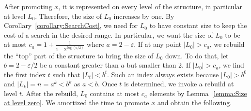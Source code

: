 \documentclass[11pt]{article}       %
\begin{document}
After promoting $x$, it is represented on every level of the structure, in particular at level $L_0$. 
Therefore, the size of $L_0$ increases by one. 
By Corollary~\ref{corollary:SearchCost}, we need for $L_0$ to have constant size to keep the cost of a search in the desired range.
In particular, we want the size of $L_0$ to be at most $c_a = 1+\frac{1}{1-2^{\log (a/2)}}$ where $a = 2-\varepsilon$. 
If at any point $|L_0| > c_a$, we rebuild the ``top'' part of the structure to bring the size of $L_0$ down. 
To do that, let $b= 2-\varepsilon/2$ be a constant greater than $a$ but smaller than 2.
If $|L_0| > c_a$, we find the first index $t$ such that $|L_t| < b^t$. 
Such an index always exists because $|L_0| > b^0$ and $|L_k| = n = a^k < b^k$ as $a < b$.
Once $t$ is determined, we invoke a rebuild at level $t$. 
After the rebuild, $L_0$ contains at most $c_a$ elements by Lemma~\ref{lemma:Size at level zero}. 
We amortized the time to promote $x$ and obtain the following.
\end{document}

